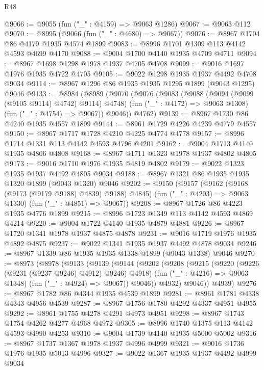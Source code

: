 \begin{lexlean}{R48}
\begin{coremodule}
@9066 := @9055 (fun ("_" : @4159) => @9063 @1286)
@9067 := @9063 @112
@9070 := @8995 (@9066 (fun ("_" : @4680) => @9067))
@9076 := @8967 @1704 @86 @4179 @1935 @4574 @1899
@9083 := @8996 @1701 @1309 @113 @4142 @4593 @4699 @4170
@9088 := @9004 @1700 @4140 @1935 @4709 @4711
@9094 := @8967 @1698 @1298 @1978 @1937 @4705 @4708
@9099 := @9016 @1697 @1976 @1935 @4722 @4705
@9105 := @9022 @1298 @1935 @1937 @4492 @4708 @9034
@9114 := @8967 @1296 @86 @1935 @1935 @1295 @1899 (@9043 @1295) @9046
@9133 := @8984
    (@8989
      (@9070
        (@9076
          (@9083
            (@9088 (@9094 (@9099 (@9105 @9114) @4742) @9114) @4748)
            (fun ("_" : @4172) => @9063 @1308)
            (fun ("_" : @4754) => @9067))
          @9046))
      @4762)
@9139 := @8967 @1730 @86 @4240 @1935 @4557 @1899
@9144 := @8961 @1729 @4226 @4239 @4779 @4557
@9150 := @8967 @1717 @1728 @4210 @4225 @4774 @4778
@9157 := @8996 @1714 @1331 @113 @4142 @4593 @4796 @4201
@9162 := @9004 @1713 @4140 @1935 @4806 @4808
@9168 := @8967 @1711 @1323 @1978 @1937 @4802 @4805
@9173 := @9016 @1710 @1976 @1935 @4819 @4802
@9179 := @9022 @1323 @1935 @1937 @4492 @4805 @9034
@9188 := @8967 @1321 @86 @1935 @1935 @1320 @1899 (@9043 @1320) @9046
@9202 := @9150
    (@9157
      (@9162 (@9168 (@9173 (@9179 @9188) @4839) @9188) @4845)
      (fun ("_" : @4203) => @9063 @1330)
      (fun ("_" : @4851) => @9067))
@9208 := @8967 @1726 @86 @4223 @1935 @4776 @1899
@9215 := @8996 @1723 @1349 @113 @4142 @4593 @4869 @4214
@9220 := @9004 @1722 @4140 @1935 @4879 @4881
@9226 := @8967 @1720 @1341 @1978 @1937 @4875 @4878
@9231 := @9016 @1719 @1976 @1935 @4892 @4875
@9237 := @9022 @1341 @1935 @1937 @4492 @4878 @9034
@9246 := @8967 @1339 @86 @1935 @1935 @1338 @1899 (@9043 @1338) @9046
@9270 := @8973
    (@8978
      (@9133
        (@9139
          (@9144
            (@9202
              (@9208
                (@9215
                  (@9220 (@9226 (@9231 (@9237 @9246) @4912) @9246) @4918)
                  (fun ("_" : @4216) => @9063 @1348)
                  (fun ("_" : @4924) => @9067))
                @9046))
            @4932)
          @9046))
      @4939)
@9276 := @8967 @1782 @86 @4344 @1935 @4539 @1899
@9281 := @8961 @1781 @4338 @4343 @4956 @4539
@9287 := @8967 @1756 @1780 @4292 @4337 @4951 @4955
@9292 := @8961 @1755 @4278 @4291 @4973 @4951
@9298 := @8967 @1743 @1754 @4262 @4277 @4968 @4972
@9305 := @8996 @1740 @1375 @113 @4142 @4593 @4990 @4253
@9310 := @9004 @1739 @4140 @1935 @5000 @5002
@9316 := @8967 @1737 @1367 @1978 @1937 @4996 @4999
@9321 := @9016 @1736 @1976 @1935 @5013 @4996
@9327 := @9022 @1367 @1935 @1937 @4492 @4999 @9034

\end{coremodule}
\end{lexlean}
